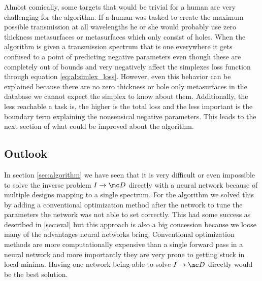 \indent
Almost comically, some targets that would be trivial for a human are very challenging for the algorithm. If a human was tasked to create the maximum possible transmission at all wavelengths he or she would probably use zero thickness metasurfaces or metasurfaces which only consist of holes. When the algorithm is given a transmission spectrum that is one everywhere it gets confused to a point of predicting negative parameters even though these are completely out of bounds and very negatively affect the simplexes loss function through equation \eqref{eq:al:simlex_loss}. However, even this behavior can be explained because there are no zero thickness or hole only metasurfaces in the database we cannot expect the simplex to know about them. Additionally, the less reachable a task is, the higher is the total loss and the less important is the boundary term explaining the nonsensical negative parameters. This leads to the next section of what could be improved about the algorithm.
\newpage

\subsection{Outlook}
In section \ref{sec:algorithm} we have seen that it is very difficult or even impossible to solve the inverse problem $I \rightarrow \mc D$ directly with a neural network because of multiple designs mapping to a single spectrum. For the algorithm we solved this by adding a conventional optimization method after the network to tune the parameters the network was not able to set correctly.
This had some success as described in \ref{sec:eval}  but this approach is also a big concession because we loose many of the advantages neural networks bring. Conventional optimization methods are more computationally expensive than a single forward pass in a neural network and more importantly they are very prone to getting stuck in local minima. Having one network being able to solve $I \rightarrow \mc D$ directly would be the best solution.
\\

